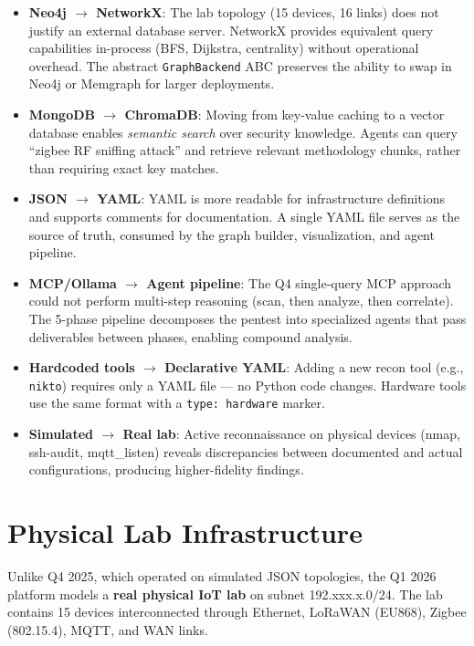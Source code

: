 \documentclass[11pt,a4paper]{article}
\begin{document}
\begin{itemize}
    \item \textbf{Neo4j $\rightarrow$ NetworkX}: The lab topology (15 devices, 16 links) does not justify an external database server. NetworkX provides equivalent query capabilities in-process (BFS, Dijkstra, centrality) without operational overhead. The abstract \texttt{GraphBackend} ABC preserves the ability to swap in Neo4j or Memgraph for larger deployments.
    \item \textbf{MongoDB $\rightarrow$ ChromaDB}: Moving from key-value caching to a vector database enables \emph{semantic search} over security knowledge. Agents can query ``zigbee RF sniffing attack'' and retrieve relevant methodology chunks, rather than requiring exact key matches.
    \item \textbf{JSON $\rightarrow$ YAML}: YAML is more readable for infrastructure definitions and supports comments for documentation. A single YAML file serves as the source of truth, consumed by the graph builder, visualization, and agent pipeline.
    \item \textbf{MCP/Ollama $\rightarrow$ Agent pipeline}: The Q4 single-query MCP approach could not perform multi-step reasoning (scan, then analyze, then correlate). The 5-phase pipeline decomposes the pentest into specialized agents that pass deliverables between phases, enabling compound analysis.
    \item \textbf{Hardcoded tools $\rightarrow$ Declarative YAML}: Adding a new recon tool (e.g., \texttt{nikto}) requires only a YAML file --- no Python code changes. Hardware tools use the same format with a \texttt{type: hardware} marker.
    \item \textbf{Simulated $\rightarrow$ Real lab}: Active reconnaissance on physical devices (nmap, ssh-audit, mqtt\_listen) reveals discrepancies between documented and actual configurations, producing higher-fidelity findings.
\end{itemize}

\section{Physical Lab Infrastructure}

Unlike Q4 2025, which operated on simulated JSON topologies, the Q1 2026 platform models a \textbf{real physical IoT lab} on subnet 192.xxx.x.0/24. The lab contains 15 devices interconnected through Ethernet, LoRaWAN (EU868), Zigbee (802.15.4), MQTT, and WAN links.
\end{document}
